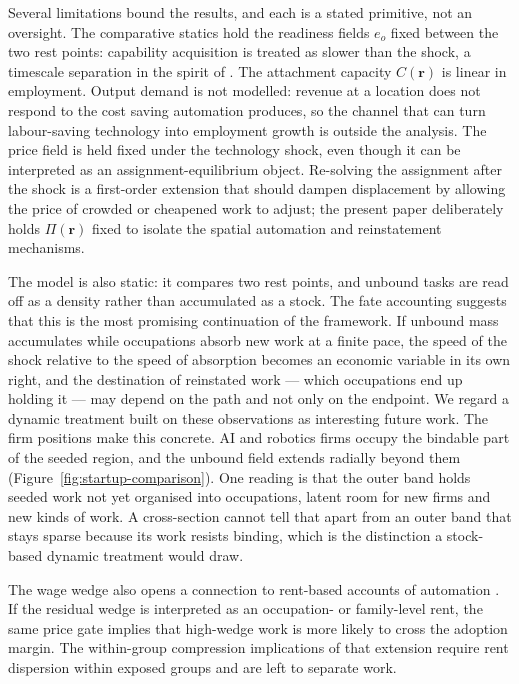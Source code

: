 \documentclass[12pt, a4paper]{article}
\begin{document}
Several limitations bound the results, and each is a stated primitive,
not an oversight. The comparative statics hold the readiness
fields $e_o$ fixed between the two rest points: capability acquisition
is treated as slower than the shock, a timescale separation in the
spirit of \textcite{adao2024fast}. The attachment capacity
$C(\mathbf{r})$ is linear in employment. Output demand is not modelled:
revenue at a location does not respond to the cost saving automation
produces, so the channel that can turn labour-saving technology into
employment growth is outside the analysis. The price field is held fixed
under
the technology shock, even though it can be interpreted as an
assignment-equilibrium object. Re-solving the assignment after the
shock is a first-order extension that should dampen displacement by
allowing the price of crowded or cheapened work to adjust; the present
paper deliberately holds $\Pi(\mathbf{r})$ fixed to isolate the spatial
automation and reinstatement mechanisms.

The model is also static: it compares two rest points, and unbound
tasks are read off as a density rather than accumulated as a stock.
The fate accounting suggests that this is the most promising
continuation of the framework. If unbound mass accumulates while
occupations absorb new work at a finite pace, the speed of the shock
relative to the speed of absorption becomes an economic variable in
its own right, and the destination of reinstated work --- which
occupations end up holding it --- may depend on the path and not only
on the endpoint. We regard a dynamic treatment built on these
observations as interesting future work. The firm positions make this
concrete. AI and robotics firms occupy the bindable part of the seeded
region, and the unbound field extends radially beyond them
(Figure~\ref{fig:startup-comparison}). One reading is that the outer
band holds seeded work not yet organised into occupations, latent room
for new firms and new kinds of work. A cross-section cannot tell that
apart from an outer band that stays sparse because its work resists
binding, which is the distinction a stock-based dynamic treatment would
draw.

The wage wedge also opens a connection to rent-based accounts of
automation \parencite{acemoglu2024rents}. If the residual wedge is interpreted as an occupation- or
family-level rent, the same price gate implies that high-wedge work is
more likely to cross the adoption margin. The within-group compression
implications of that extension require rent dispersion within exposed
groups and are left to separate work.
\end{document}
